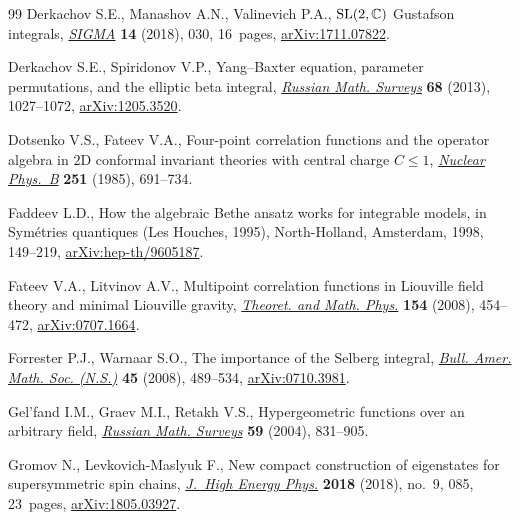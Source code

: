 \documentclass[pdftex]{sigma}
\numberwithin{equation}{section}
\begin{document}
\begin{thebibliography}{99}
Derkachov S.E., Manashov A.N., Valinevich P.A., {${\rm SL}(2,{\mathbb C})$}
 {G}ustafson integrals, \href{https://doi.org/10.3842/SIGMA.2018.030}{\textit{SIGMA}} \textbf{14} (2018), 030, 16~pages,
 \href{https://arxiv.org/abs/1711.07822}{arXiv:1711.07822}.

Derkachov S.E., Spiridonov V.P., Yang--{B}axter equation, parameter
 permutations, and the elliptic beta integral, \href{https://doi.org/10.1070/rm2013v068n06abeh004869}{\textit{Russian Math. Surveys}}
 \textbf{68} (2013), 1027--1072, \href{https://arxiv.org/abs/1205.3520}{arXiv:1205.3520}.

Dotsenko V.S., Fateev V.A., Four-point correlation functions and the operator
 algebra in {$2$}{D} conformal invariant theories with central charge {$C\leq
 1$}, \href{https://doi.org/10.1016/S0550-3213(85)80004-3}{\textit{Nuclear Phys.~B}} \textbf{251} (1985), 691--734.

Faddeev L.D., How the algebraic {B}ethe ansatz works for integrable models, in
 Sym\'etries quantiques ({L}es {H}ouches, 1995), North-Holland, Amsterdam,
 1998, 149--219, \href{https://arxiv.org/abs/hep-th/9605187}{arXiv:hep-th/9605187}.

Fateev V.A., Litvinov A.V., Multipoint correlation functions in {L}iouville
 field theory and minimal {L}iouville gravity, \href{https://doi.org/10.1007/s11232-008-0038-3}{\textit{Theoret. and Math.
 Phys.}} \textbf{154} (2008), 454--472, \href{https://arxiv.org/abs/0707.1664}{arXiv:0707.1664}.

Forrester P.J., Warnaar S.O., The importance of the {S}elberg integral,
 \href{https://doi.org/10.1090/S0273-0979-08-01221-4}{\textit{Bull. Amer. Math. Soc. (N.S.)}} \textbf{45} (2008), 489--534,
 \href{https://arxiv.org/abs/0710.3981}{arXiv:0710.3981}.

Gel'fand I.M., Graev M.I., Retakh V.S., Hypergeometric functions over an
 arbitrary field, \href{https://doi.org/10.1070/RM2004v059n05ABEH000771}{\textit{Russian Math. Surveys}} \textbf{59} (2004), 831--905.

Gromov N., Levkovich-Maslyuk F., New compact construction of eigenstates for
 supersymmetric spin chains, \href{https://doi.org/10.1007/jhep09(2018)085}{\textit{J.~High Energy Phys.}} \textbf{2018}
 (2018), no.~9, 085, 23~pages, \href{https://arxiv.org/abs/1805.03927}{arXiv:1805.03927}.


\end{thebibliography}
\end{document}
